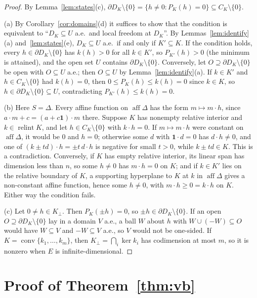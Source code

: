 \documentclass[11pt]{article}
\newcommand{\one}{\mathbf{1}}
\DeclareMathOperator{\conv}{conv}
\DeclareMathOperator{\relint}{relint}
\DeclareMathOperator{\aff}{aff}
\theoremstyle{plain}
\theoremstyle{definition}
\theoremstyle{remark}
\begin{document}
\begin{proof}
By Lemma~\ref{lem:states}(c), $\partial D_K\setminus\{0\}=\{h\ne0:P_K(h)=0\}\subseteq C_K
\setminus\{0\}$.

(a) By Corollary~\ref{cor:domains}(d) it suffices to show that the condition is equivalent to
``$D_K\subseteq U$ a.e.\ and local freedom at $D_K$''. By Lemmas~\ref{lem:identify}(a)
and~\ref{lem:states}(e), $D_K\subseteq U$ a.e.\ if and only if $K'\subseteq K$. If the
condition holds, every $h\in\partial D_K\setminus\{0\}$ has $k(h)>0$ for all $k\in K'$, so
$P_{K'}(h)>0$ (the minimum is attained), and the open set $U$ contains $\partial D_K\setminus
\{0\}$. Conversely, let $O\supseteq\partial D_K\setminus\{0\}$ be open with $O\subseteq U$ a.e.;
then $O\subseteq U$ by Lemma~\ref{lem:identify}(a). If $k\in K'$ and $h\in C_K\setminus\{0\}$ had
$k(h)=0$, then $0\le P_K(h)\le k(h)=0$ since $k\in K$, so $h\in\partial D_K\setminus\{0\}
\subseteq U$, contradicting $P_{K'}(h)\le k(h)=0$.

(b) Here $S=\Delta$. Every affine function on $\aff\Delta$ has the form $m\mapsto m\cdot h$,
since $a\cdot m+c=(a+c\one)\cdot m$ there. Suppose $K$ has nonempty relative interior and $k\in
\relint K$, and let $h\in C_K\setminus\{0\}$ with $k\cdot h=0$. If $m\mapsto m\cdot h$ were
constant on $\aff\Delta$, it would be $0$ and $h=0$; otherwise some $d$ with $\one\cdot d=0$ has
$d\cdot h\ne0$, and one of $(k\pm td)\cdot h=\pm t\,d\cdot h$ is negative for small $t>0$, while
$k\pm td\in K$. This is a contradiction. Conversely, if $K$ has empty relative interior, its
linear span has dimension less than $n$, so some $h\ne0$ has $m\cdot h=0$ on $K$; and if $k\in
K'$ lies on the relative boundary of $K$, a supporting hyperplane to $K$ at $k$ in $\aff\Delta$
\cite[Thm.~11.6]{Rockafellar} gives a non-constant affine function, hence some $h\ne0$, with
$m\cdot h\ge0=k\cdot h$ on $K$. Either way the condition fails.

(c) Let $0\ne h\in K_\perp$. Then $P_K(\pm h)=0$, so $\pm h\in\partial D_K\setminus\{0\}$. If an
open $O\supseteq\partial D_K\setminus\{0\}$ lay in a domain $V$ a.e., a ball $W$ about $h$ with
$W\cup(-W)\subseteq O$ would have $W\subseteq V$ and $-W\subseteq V$ a.e., so $V$ would not be
one-sided. If $K=\conv\{k_1,\dots,k_m\}$, then $K_\perp=\bigcap_i\ker k_i$ has codimension at most
$m$, so it is nonzero when $E$ is infinite-dimensional.
\end{proof}

\section{Proof of Theorem~\ref{thm:vb}}\label{app:vb}
\end{document}
